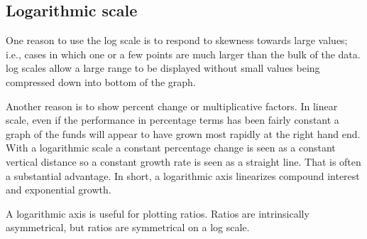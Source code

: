 \documentclass[12pt]{article}
\begin{document}
\subsection{Logarithmic scale}
\par One reason to use the log scale is to respond to skewness towards large values; i.e., cases in which one or a few points are much larger than the bulk of the data. log scales allow a large range to be displayed without small values being compressed down into bottom of the graph.
\par Another reason is to show percent change or multiplicative factors. In linear scale, even if the performance in percentage terms has been fairly constant a graph of the funds will appear to have grown most rapidly at the right hand end. With a logarithmic scale a constant percentage change is seen as a constant vertical distance so a constant growth rate is seen as a straight line. That is often a substantial advantage. In short, a logarithmic axis linearizes compound interest and exponential growth.
\par A logarithmic axis is useful for plotting ratios. Ratios are intrinsically asymmetrical, but ratios are symmetrical on a log scale.
\end{document}
